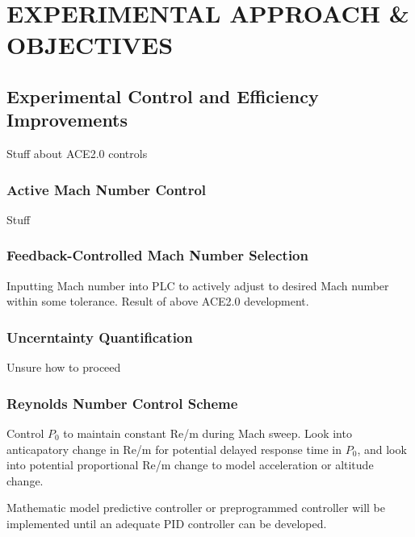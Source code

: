 %
%  
%

\chapter{EXPERIMENTAL APPROACH \& OBJECTIVES}

\section{Experimental Control and Efficiency Improvements} 

Stuff about ACE2.0 controls

\subsection{Active Mach Number Control}

Stuff

\subsection{Feedback-Controlled Mach Number Selection}

Inputting Mach number into PLC to actively adjust to desired Mach number within some tolerance. Result of above ACE2.0 development.

\subsection{Uncerntainty Quantification}

Unsure how to proceed

\subsection{Reynolds Number Control Scheme}

Control $P_{0}$ to maintain constant Re/m during Mach sweep. Look into anticapatory change in Re/m for potential delayed response time in $P_{0}$, and look into potential proportional Re/m change to model acceleration or altitude change.

Mathematic model predictive controller or preprogrammed controller will be implemented until an adequate PID controller can be developed.

